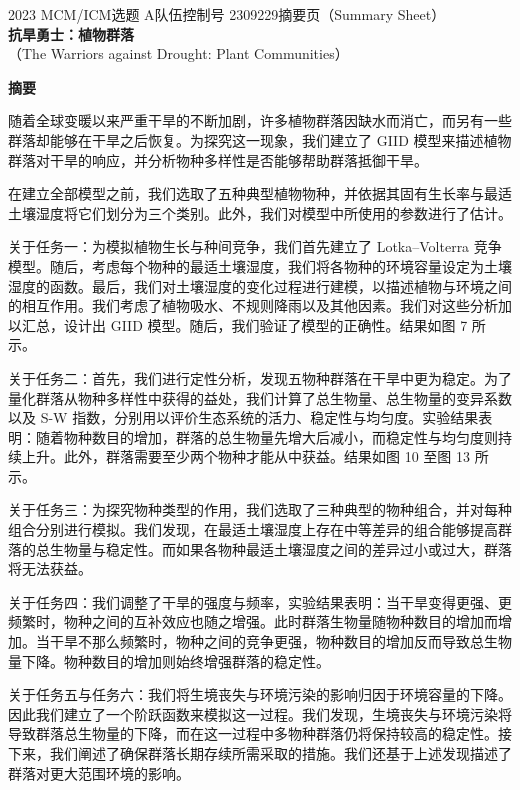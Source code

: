 \documentclass[11pt,a4paper]{ctexart}
\begin{document}
\thispagestyle{empty}
\begin{center}
{\small 2023 MCM/ICM\quad 选题 A\quad 队伍控制号 2309229\quad 摘要页（Summary Sheet）}\\[18pt]
{\LARGE\bfseries 抗旱勇士：植物群落}\\[8pt]
{\large （The Warriors against Drought: Plant Communities）}\\[10pt]
\end{center}

\begin{center}
{\large\bfseries 摘\quad 要}
\end{center}

\vspace{6pt}
随着全球变暖以来严重干旱的不断加剧，许多植物群落因缺水而消亡，而另有一些群落却能够在干旱之后恢复。为探究这一现象，我们建立了 GIID 模型来描述植物群落对干旱的响应，并分析物种多样性是否能够帮助群落抵御干旱。

在建立全部模型之前，我们选取了五种典型植物物种，并依据其固有生长率与最适土壤湿度将它们划分为三个类别。此外，我们对模型中所使用的参数进行了估计。

关于任务一：为模拟植物生长与种间竞争，我们首先建立了 Lotka--Volterra 竞争模型。随后，考虑每个物种的最适土壤湿度，我们将各物种的环境容量设定为土壤湿度的函数。最后，我们对土壤湿度的变化过程进行建模，以描述植物与环境之间的相互作用。我们考虑了植物吸水、不规则降雨以及其他因素。我们对这些分析加以汇总，设计出 GIID 模型。随后，我们验证了模型的正确性。结果如图 7 所示。

关于任务二：首先，我们进行定性分析，发现五物种群落在干旱中更为稳定。为了量化群落从物种多样性中获得的益处，我们计算了总生物量、总生物量的变异系数以及 S-W 指数，分别用以评价生态系统的活力、稳定性与均匀度。实验结果表明：随着物种数目的增加，群落的总生物量先增大后减小，而稳定性与均匀度则持续上升。此外，群落需要至少两个物种才能从中获益。结果如图 10 至图 13 所示。

关于任务三：为探究物种类型的作用，我们选取了三种典型的物种组合，并对每种组合分别进行模拟。我们发现，在最适土壤湿度上存在中等差异的组合能够提高群落的总生物量与稳定性。而如果各物种最适土壤湿度之间的差异过小或过大，群落将无法获益。

关于任务四：我们调整了干旱的强度与频率，实验结果表明：当干旱变得更强、更频繁时，物种之间的互补效应也随之增强。此时群落生物量随物种数目的增加而增加。当干旱不那么频繁时，物种之间的竞争更强，物种数目的增加反而导致总生物量下降。物种数目的增加则始终增强群落的稳定性。

关于任务五与任务六：我们将生境丧失与环境污染的影响归因于环境容量的下降。因此我们建立了一个阶跃函数来模拟这一过程。我们发现，生境丧失与环境污染将导致群落总生物量的下降，而在这一过程中多物种群落仍将保持较高的稳定性。接下来，我们阐述了确保群落长期存续所需采取的措施。我们还基于上述发现描述了群落对更大范围环境的影响。
\end{document}

